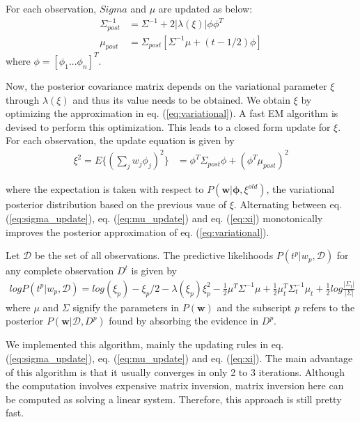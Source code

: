 For each observation, $Sigma$ and $\mu$ are updated as below: 
\begin{align}
\label{eq:sigma_update}
\Sigma^{-1}_{post} &= \Sigma^{-1} + 2|\lambda(\xi)|\phi\phi^T\\
\label{eq:mu_update}
\mu_{post} &= \Sigma_{post}[\Sigma^{-1}\mu + (t - 1/2)\phi]
\end{align}
where $\phi = [\phi_1 ...\phi_n]^T$. 

Now, the posterior covariance matrix depends on the variational parameter $\xi$ through $\lambda(\xi)$ and thus its value needs to be obtained. We obtain $\xi$ by optimizing the approximation in eq. (\ref{eq:variational}). A fast EM algorithm is devised to perform this optimization. This leads to a closed form update for $\xi$. For each observation, the update equation is given by 
\begin{align}
\label{eq:xi}
\xi^2 = E\{(\sum_jw_j\phi_j)^2\} &= \phi^T\Sigma_{post}\phi + (\phi^T\mu_{post})^2
\end{align}

where the expectation is taken with respect to $P(\bm{w}|\bm{\phi}, \xi^{old})$, the variational posterior distribution based on the previous vaue of $\xi$. Alternating between eq. (\ref{eq:sigma_update}), eq. (\ref{eq:mu_update}) and eq. (\ref{eq:xi}) monotonically improves the posterior approximation of eq. (\ref{eq:variational}).

Let $\mathcal{D}$ be the set of all observations. The predictive likelihoods $P(t^p | w_p, \mathcal{D})$ for any complete observation $D^t$ is given by
\begin{align}
  logP(t^p|w_p, \mathcal{D}) = log(\xi_p) - \xi_p/2 - \lambda(\xi_p)\xi_p^2 - \frac{1}{2}\mu^T\Sigma^{-1}\mu + \frac{1}{2}\mu^T_t\Sigma^{-1}_t\mu_t + \frac{1}{2}log\frac{|\Sigma_t|}{|\Sigma|}
\end{align}
where $\mu$ and $\Sigma$ signify the parameters in $P(\bm{w})$ and the subscript $p$ refers to the posterior $P(\bm{w}|\mathcal{D}, D^p)$ found by absorbing the evidence in $D^p$.

We implemented this algorithm, mainly the updating rules in eq. (\ref{eq:sigma_update}), eq. (\ref{eq:mu_update}) and eq. (\ref{eq:xi}). The main advantage of this algorithm is that it usually converges in only 2 to 3 iterations. Although the computation involves expensive matrix inversion, matrix inversion here can be computed as solving a linear system. Therefore, this approach is still pretty fast.


